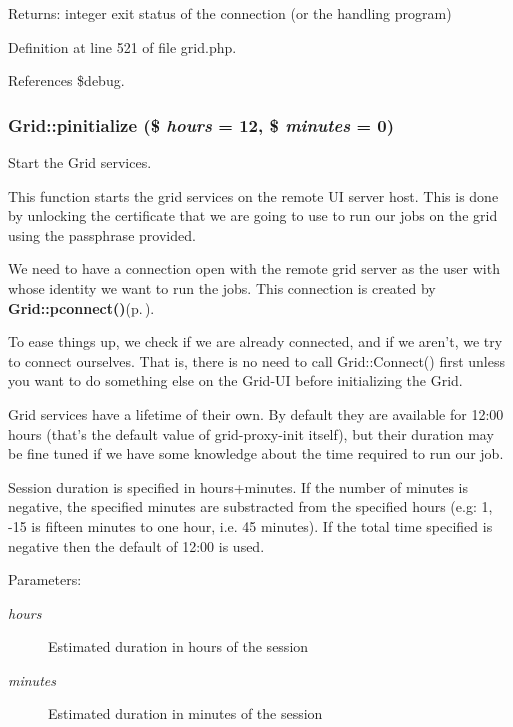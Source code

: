 \begin{Desc}
\item[Returns:]integer exit status of the connection (or the handling program) \end{Desc}


Definition at line 521 of file grid.php.

References \$debug.
\subsubsection{\setlength{\rightskip}{0pt plus 5cm}Grid::pinitialize (\$ {\em hours} = 12, \$ {\em minutes} = 0)}\label{classGrid_a11}


Start the Grid services. 

This function starts the grid services on the remote UI server host. This is done by unlocking the certificate that we are going to use to run our jobs on the grid using the passphrase provided.

We need to have a connection open with the remote grid server as the user with whose identity we want to run the jobs. This connection is created by {\bf Grid::pconnect()}{\rm (p.\,\pageref{classGrid_a9})}.

To ease things up, we check if we are already connected, and if we aren't, we try to connect ourselves. That is, there is no need to call Grid::Connect() first unless you want to do something else on the Grid-UI before initializing the Grid.

Grid services have a lifetime of their own. By default they are available for 12:00 hours (that's the default value of grid-proxy-init itself), but their duration may be fine tuned if we have some knowledge about the time required to run our job.

Session duration is specified in hours+minutes. If the number of minutes is negative, the specified minutes are substracted from the specified hours (e.g: 1, -15 is fifteen minutes to one hour, i.e. 45 minutes). If the total time specified is negative then the default of 12:00 is used.

\begin{Desc}
\item[Parameters:]
\begin{description}
\item[{\em hours}]Estimated duration in hours of the session\item[{\em minutes}]Estimated duration in minutes of the session \end{description}
\end{Desc}


